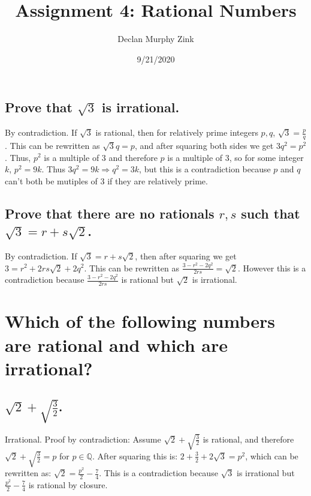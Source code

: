 \documentclass[12pt]{article}
\begin{document}
\title{Assignment 4: Rational Numbers}
\author{Declan Murphy Zink}
\date{9/21/2020}
\maketitle

\setcounter{section}{0}

\section{}
\subsection{Prove that $\sqrt{3}$ is irrational.}
By contradiction. If $\sqrt{3}$ is rational, then for relatively prime integers $p,q$, $\sqrt{3} = \frac{p}{q}$.
This can be rewritten as $\sqrt{3} q = p$, and after squaring both sides we get $3q^2 = p^2$.
Thus, $p^2$ is a multiple of 3 and therefore $p$ is a multiple of 3, so for some integer $k$, $p^2 = 9k$.
Thus $3q^2 = 9k \Rightarrow q^2 = 3k$,
but this is a contradiction because $p$ and $q$ can't both be mutiples of 3 if they are relatively prime.

\subsection{Prove that there are no rationals $r,s$ such that $\sqrt{3} = r + s \sqrt{2}$.}
By contradiction. If $\sqrt{3} = r + s \sqrt{2}$, then after squaring we get $3 = r^2 + 2rs \sqrt{2} + 2q^2$.
This can be rewritten as $\frac{3 - r^2 - 2q^2}{2rs} = \sqrt{2}$.
However this is a contradiction because $\frac{3 - r^2 - 2q^2}{2rs}$ is rational but $\sqrt{2}$ is irrational.

\section{Which of the following numbers are rational and which are irrational?}
\subsection{$\sqrt{2} + \sqrt{\frac{3}{2}}$.}
Irrational. Proof by contradiction: 
Assume $\sqrt{2} + \sqrt{\frac{3}{2}}$ is rational, 
and therefore $\sqrt{2} + \sqrt{\frac{3}{2}} = p$ for $p \in \mathds{Q}$.
After squaring this is: $2 + \frac{3}{2} + 2 \sqrt{3} = p^2$, 
which can be rewritten as: $\sqrt{2} = \frac{p^2}{2} - \frac{7}{4}$.
This is a contradiction because $\sqrt{3}$ is irrational but $\frac{p^2}{2} - \frac{7}{4}$ is rational by closure.
\end{document}
